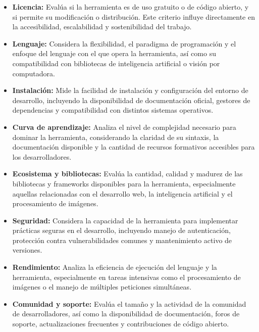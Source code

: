 \begin{itemize}
    \item \textbf{Licencia:} Evalúa si la herramienta es de uso gratuito o de código abierto, y si permite su modificación o distribución. Este criterio influye directamente en la accesibilidad, escalabilidad y sostenibilidad del trabajo.

    \item \textbf{Lenguaje:} Considera la flexibilidad, el paradigma de programación y el enfoque del lenguaje con el que opera la herramienta, así como su compatibilidad con bibliotecas de inteligencia artificial o visión por computadora.

    \item \textbf{Instalación:} Mide la facilidad de instalación y configuración del entorno de desarrollo, incluyendo la disponibilidad de documentación oficial, gestores de dependencias y compatibilidad con distintos sistemas operativos.

    \item \textbf{Curva de aprendizaje:} Analiza el nivel de complejidad necesario para dominar la herramienta, considerando la claridad de su sintaxis, la documentación disponible y la cantidad de recursos formativos accesibles para los desarrolladores.

    \item \textbf{Ecosistema y bibliotecas:} Evalúa la cantidad, calidad y madurez de las bibliotecas y frameworks disponibles para la herramienta, especialmente aquellas relacionadas con el desarrollo web, la inteligencia artificial y el procesamiento de imágenes.

    \item \textbf{Seguridad:} Considera la capacidad de la herramienta para implementar prácticas seguras en el desarrollo, incluyendo manejo de autenticación, protección contra vulnerabilidades comunes y mantenimiento activo de versiones.

    \item \textbf{Rendimiento:} Analiza la eficiencia de ejecución del lenguaje y la herramienta, especialmente en tareas intensivas como el procesamiento de imágenes o el manejo de múltiples peticiones simultáneas.

    \item \textbf{Comunidad y soporte:} Evalúa el tamaño y la actividad de la comunidad de desarrolladores, así como la disponibilidad de documentación, foros de soporte, actualizaciones frecuentes y contribuciones de código abierto.
\end{itemize}


